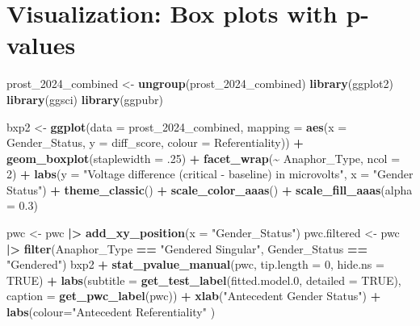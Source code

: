 \documentclass[
  10pt,
]{article}
\newenvironment{Shaded}{\begin{snugshade}}{\end{snugshade}}
\newcommand{\AttributeTok}[1]{\textcolor[rgb]{0.13,0.29,0.53}{#1}}
\newcommand{\ConstantTok}[1]{\textcolor[rgb]{0.56,0.35,0.01}{#1}}
\newcommand{\DecValTok}[1]{\textcolor[rgb]{0.00,0.00,0.81}{#1}}
\newcommand{\FloatTok}[1]{\textcolor[rgb]{0.00,0.00,0.81}{#1}}
\newcommand{\FunctionTok}[1]{\textcolor[rgb]{0.13,0.29,0.53}{\textbf{#1}}}
\newcommand{\NormalTok}[1]{#1}
\newcommand{\OtherTok}[1]{\textcolor[rgb]{0.56,0.35,0.01}{#1}}
\newcommand{\SpecialCharTok}[1]{\textcolor[rgb]{0.81,0.36,0.00}{\textbf{#1}}}
\newcommand{\StringTok}[1]{\textcolor[rgb]{0.31,0.60,0.02}{#1}}
\begin{document}
\section{Visualization: Box plots with
p-values}\label{visualization-box-plots-with-p-values}

\begin{Shaded}
\begin{Highlighting}[]
\NormalTok{prost\_2024\_combined }\OtherTok{\textless{}{-}} \FunctionTok{ungroup}\NormalTok{(prost\_2024\_combined)}
\FunctionTok{library}\NormalTok{(ggplot2)}
\FunctionTok{library}\NormalTok{(ggsci)}
\FunctionTok{library}\NormalTok{(ggpubr)}

\NormalTok{bxp2 }\OtherTok{\textless{}{-}} \FunctionTok{ggplot}\NormalTok{(}\AttributeTok{data =}\NormalTok{ prost\_2024\_combined,}
       \AttributeTok{mapping =} \FunctionTok{aes}\NormalTok{(}\AttributeTok{x =}\NormalTok{ Gender\_Status, }\AttributeTok{y =}\NormalTok{ diff\_score, }\AttributeTok{colour =}\NormalTok{ Referentiality)) }\SpecialCharTok{+}
  \FunctionTok{geom\_boxplot}\NormalTok{(}\AttributeTok{staplewidth =}\NormalTok{ .}\DecValTok{25}\NormalTok{) }\SpecialCharTok{+}
  \FunctionTok{facet\_wrap}\NormalTok{(}\SpecialCharTok{\textasciitilde{}}\NormalTok{ Anaphor\_Type, }\AttributeTok{ncol =} \DecValTok{2}\NormalTok{) }\SpecialCharTok{+}
  \FunctionTok{labs}\NormalTok{(}\AttributeTok{y =} \StringTok{"Voltage difference (critical {-} baseline) in microvolts"}\NormalTok{, }\AttributeTok{x =} \StringTok{"Gender Status"}\NormalTok{) }\SpecialCharTok{+}
  \FunctionTok{theme\_classic}\NormalTok{() }\SpecialCharTok{+}
  \FunctionTok{scale\_color\_aaas}\NormalTok{() }\SpecialCharTok{+}
  \FunctionTok{scale\_fill\_aaas}\NormalTok{(}\AttributeTok{alpha =} \FloatTok{0.3}\NormalTok{)}


\NormalTok{pwc }\OtherTok{\textless{}{-}}\NormalTok{ pwc }\SpecialCharTok{|\textgreater{}} \FunctionTok{add\_xy\_position}\NormalTok{(}\AttributeTok{x =} \StringTok{"Gender\_Status"}\NormalTok{)}
\NormalTok{pwc.filtered }\OtherTok{\textless{}{-}}\NormalTok{ pwc }\SpecialCharTok{|\textgreater{}} 
  \FunctionTok{filter}\NormalTok{(Anaphor\_Type }\SpecialCharTok{==} \StringTok{"Gendered Singular"}\NormalTok{, Gender\_Status }\SpecialCharTok{==} \StringTok{"Gendered"}\NormalTok{)}
\NormalTok{bxp2 }\SpecialCharTok{+} 
  \FunctionTok{stat\_pvalue\_manual}\NormalTok{(pwc, }\AttributeTok{tip.length =} \DecValTok{0}\NormalTok{, }\AttributeTok{hide.ns =} \ConstantTok{TRUE}\NormalTok{) }\SpecialCharTok{+}
  \FunctionTok{labs}\NormalTok{(}\AttributeTok{subtitle =} \FunctionTok{get\_test\_label}\NormalTok{(fitted.model}\FloatTok{.0}\NormalTok{, }\AttributeTok{detailed =} \ConstantTok{TRUE}\NormalTok{), }\AttributeTok{caption =} \FunctionTok{get\_pwc\_label}\NormalTok{(pwc)) }\SpecialCharTok{+}
  \FunctionTok{xlab}\NormalTok{(}\StringTok{"Antecedent Gender Status"}\NormalTok{) }\SpecialCharTok{+}
  \FunctionTok{labs}\NormalTok{(}\AttributeTok{colour=}\StringTok{"Antecedent Referentiality"}\NormalTok{ )}
\end{Highlighting}
\end{Shaded}
\end{document}
